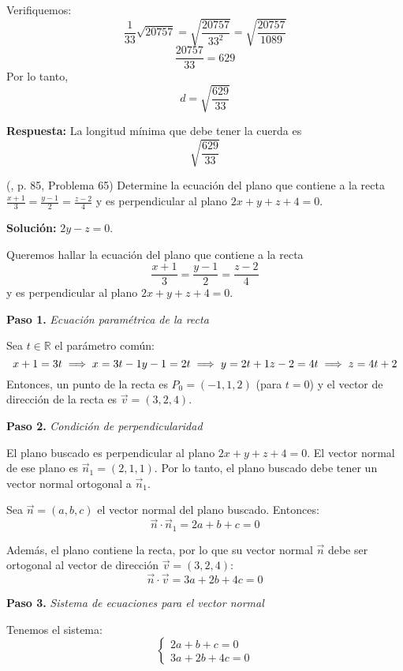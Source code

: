 \begin{prob}
\begin{myproof}
Verifiquemos:
\[
\frac{1}{33}\sqrt{20757} = \sqrt{\frac{20757}{33^2}} = \sqrt{\frac{20757}{1089}}
\]
\[
\frac{20757}{33} = 629
\]
Por lo tanto,
\[
d = \sqrt{\frac{629}{33}}
\]

\textbf{Respuesta:}  
La longitud mínima que debe tener la cuerda es
\[
\boxed{\sqrt{\dfrac{629}{33}}}
\]
\end{myproof}

\end{prob}

\begin{prob} (\cite{espinoza2006Algebralineal}, p. 85, Problema 65) Determine la ecuación del plano que contiene a la recta $\frac{x+1}{3}=\frac{y-1}{2}=\frac{z-2}{4}$ y es perpendicular al plano $2x+y+z+4=0$. 

\textbf{Solución:} $2y-z=0$.

\begin{myproof}
Queremos hallar la ecuación del plano que contiene a la recta
\[
\frac{x+1}{3} = \frac{y-1}{2} = \frac{z-2}{4}
\]
y es perpendicular al plano $2x + y + z + 4 = 0$.

\textbf{Paso 1.} \quad \textit{Ecuación paramétrica de la recta}

Sea $t \in \mathbb{R}$ el parámetro común:
\[
x + 1 = 3t \implies x = 3t - 1 \\
y - 1 = 2t \implies y = 2t + 1 \\
z - 2 = 4t \implies z = 4t + 2
\]
Entonces, un punto de la recta es $P_0 = (-1, 1, 2)$ (para $t = 0$) y el vector de dirección de la recta es $\vec{v} = (3, 2, 4)$.

\textbf{Paso 2.} \quad \textit{Condición de perpendicularidad}

El plano buscado es perpendicular al plano $2x + y + z + 4 = 0$.  
El vector normal de ese plano es $\vec{n}_1 = (2, 1, 1)$.  
Por lo tanto, el plano buscado debe tener un vector normal ortogonal a $\vec{n}_1$.

Sea $\vec{n} = (a, b, c)$ el vector normal del plano buscado.  
Entonces:
\[
\vec{n} \cdot \vec{n}_1 = 2a + b + c = 0
\]

Además, el plano contiene la recta, por lo que su vector normal $\vec{n}$ debe ser ortogonal al vector de dirección $\vec{v} = (3, 2, 4)$:
\[
\vec{n} \cdot \vec{v} = 3a + 2b + 4c = 0
\]

\textbf{Paso 3.} \quad \textit{Sistema de ecuaciones para el vector normal}

Tenemos el sistema:
\[
\begin{cases}
2a + b + c = 0 \\
3a + 2b + 4c = 0
\end{cases}
\]


\end{myproof}
\end{prob}
